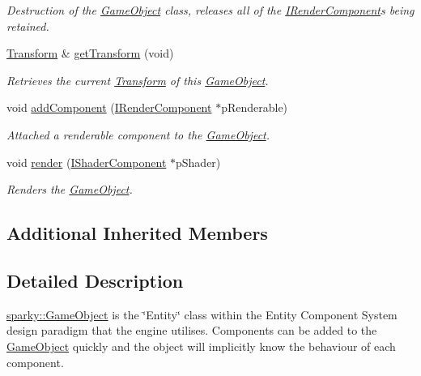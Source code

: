 \begin{DoxyCompactItemize}
\begin{DoxyCompactList}\small\item\em Destruction of the \hyperlink{classsparky_1_1_game_object}{Game\+Object} class, releases all of the \hyperlink{classsparky_1_1_i_render_component}{I\+Render\+Component}\textquotesingle{}s being retained. \end{DoxyCompactList}\item 
\hyperlink{classsparky_1_1_transform}{Transform} \& \hyperlink{classsparky_1_1_game_object_a2d1cea0a6b1161f7ae9e433b5eef7655}{get\+Transform} (void)
\begin{DoxyCompactList}\small\item\em Retrieves the current \hyperlink{classsparky_1_1_transform}{Transform} of this \hyperlink{classsparky_1_1_game_object}{Game\+Object}. \end{DoxyCompactList}\item 
void \hyperlink{classsparky_1_1_game_object_ac84af9cef43bab887437b7257c6237db}{add\+Component} (\hyperlink{classsparky_1_1_i_render_component}{I\+Render\+Component} $\ast$p\+Renderable)
\begin{DoxyCompactList}\small\item\em Attached a renderable component to the \hyperlink{classsparky_1_1_game_object}{Game\+Object}. \end{DoxyCompactList}\item 
void \hyperlink{classsparky_1_1_game_object_aeb6a8aa0eb3fdcd7e0611ca1fef8dd24}{render} (\hyperlink{classsparky_1_1_i_shader_component}{I\+Shader\+Component} $\ast$p\+Shader)
\begin{DoxyCompactList}\small\item\em Renders the \hyperlink{classsparky_1_1_game_object}{Game\+Object}. \end{DoxyCompactList}\end{DoxyCompactItemize}
\subsection*{Additional Inherited Members}


\subsection{Detailed Description}
\hyperlink{classsparky_1_1_game_object}{sparky\+::\+Game\+Object} is the \char`\"{}\+Entity\char`\"{} class within the Entity Component System design paradigm that the engine utilises. Components can be added to the \hyperlink{classsparky_1_1_game_object}{Game\+Object} quickly and the object will implicitly know the behaviour of each component.

